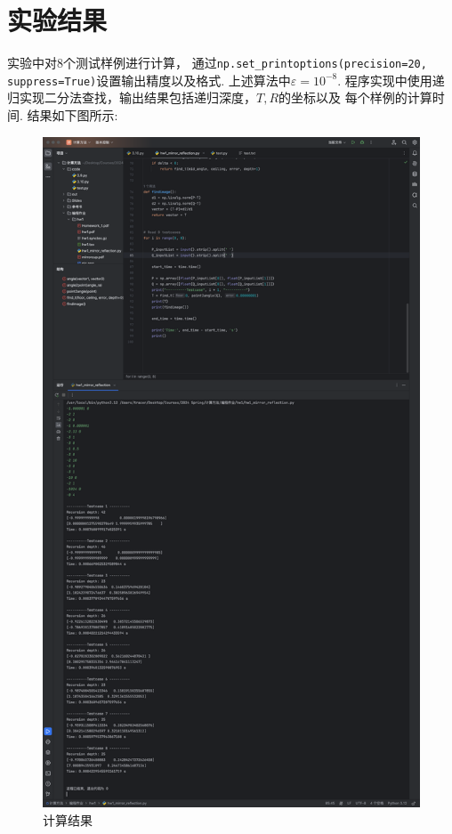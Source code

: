 \documentclass[UTF8]{ctexart}
\begin{document}
\section{实验结果}
实验中对8个测试样例进行计算，
通过\lstinline{np.set_printoptions(precision=20, suppress=True)}设置输出精度以及格式. 
上述算法中$\varepsilon = 10^{-8}$. 程序实现中使用递归实现二分法查找，输出结果包括递归深度，$T, R$的坐标以及
每个样例的计算时间. 结果如下图所示:
\begin{figure}[H]
  \centering
  \includegraphics[scale=0.23]{test.png}
  \caption{计算结果}
\end{figure}
\end{document}

